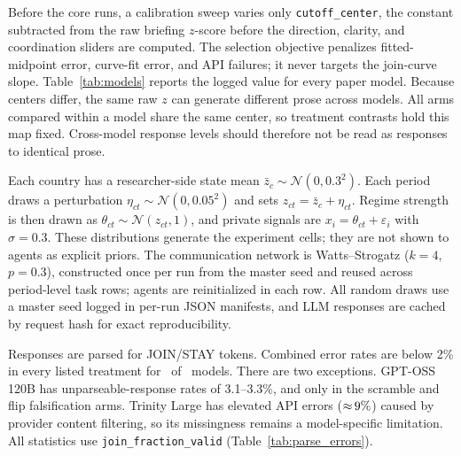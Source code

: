 \documentclass[12pt]{article}
\begin{document}
Before the core runs, a calibration sweep varies only \texttt{cutoff\_center}, the constant subtracted from the raw briefing $z$-score before the direction, clarity, and coordination sliders are computed. The selection objective penalizes fitted-midpoint error, curve-fit error, and API failures; it never targets the join-curve slope. Table~\ref{tab:models} reports the logged value for every paper model. Because centers differ, the same raw $z$ can generate different prose across models. All arms compared within a model share the same center, so treatment contrasts hold this map fixed. Cross-model response levels should therefore not be read as responses to identical prose.

Each country has a researcher-side state mean $\bar{z}_c \sim \mathcal{N}(0, 0.3^2)$. Each period draws a perturbation $\eta_{ct} \sim \mathcal{N}(0, 0.05^2)$ and sets $z_{ct}=\bar{z}_c+\eta_{ct}$. Regime strength is then drawn as $\theta_{ct} \sim \mathcal{N}(z_{ct}, 1)$, and private signals are $x_i = \theta_{ct} + \varepsilon_i$ with $\sigma = 0.3$. These distributions generate the experiment cells; they are not shown to agents as explicit priors. The communication network is Watts--Strogatz ($k = 4$, $p = 0.3$), constructed once per run from the master seed and reused across period-level task rows; agents are reinitialized in each row. All random draws use a master seed logged in per-run JSON manifests, and LLM responses are cached by request hash for exact reproducibility.

\label{sec:parse_errors}Responses are parsed for JOIN/STAY tokens. Combined error rates are below 2\% in every listed treatment for \ParseErrModelsBelowTwo\ of \ParseErrNModels\ models. There are two exceptions. GPT-OSS 120B has unparseable-response rates of 3.1--3.3\%, and only in the scramble and flip falsification arms. Trinity Large has elevated API errors (${\approx}\,9\%$) caused by provider content filtering, so its missingness remains a model-specific limitation. All statistics use \texttt{join\_fraction\_valid} (Table~\ref{tab:parse_errors}).

\end{document}
